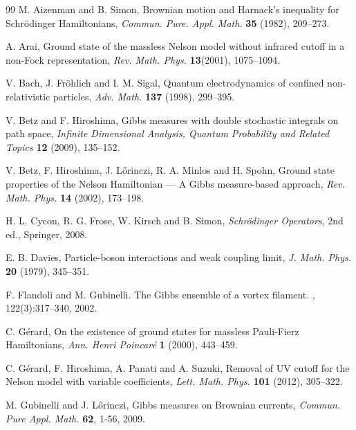 \documentclass[12pt]{article}
\providecommand{\1}{\mathbb{1}}
\begin{document}
{%
\begin{thebibliography}{99}
M.  Aizenman and B. Simon,
Brownian motion and Harnack's inequality for Schr\"odinger Hamiltonians,
{\it Commun. Pure. Appl. Math. }{\bf 35} (1982), 209--273.

A.  Arai,
Ground state of the massless Nelson model without infrared cutoff in a non-Fock representation,
{\it Rev. Math. Phys.} {\bf 13}(2001), 1075--1094.

V.  Bach,   J.  Fr\"ohlich and    I.  M.  Sigal,
Quantum electrodynamics of confined non-relativistic particles, {\it  Adv. Math. } {\bf 137}
(1998),   299--395.

V. Betz and F. Hiroshima,
Gibbs measures with double stochastic integrals on path space,
{\it Infinite Dimensional Analysis,  Quantum Probability and Related Topics}
{\bf 12} (2009),  135--152.


V.  Betz, F.  Hiroshima,  J.  L\H orinczi,
R.  A.  Minlos and H.  Spohn,
Ground state properties of the Nelson Hamiltonian --- A Gibbs measure-based approach,
{\it Rev. Math. Phys.} {\bf 14}  (2002), 173--198.


H. L.  Cycon, R.  G.  Frose, W.  Kirsch
and B.  Simon,
{\it Schr\"odinger Operators}, 2nd ed., Springer, 2008.

E. B.  Davies,   Particle-boson interactions and weak coupling limit,
{\it  J. Math. Phys.} {\bf 20}  (1979),  345--351.


F. Flandoli and M. Gubinelli. 
\newblock The {G}ibbs ensemble of a vortex filament. 
, 122(3):317--340, 2002.

C.  G\'erard,
On the existence of ground states for massless Pauli-Fierz Hamiltonians,
{\it Ann.  Henri  Poincar\'e} {\bf 1}  (2000),  443--459.


C. G\'erard, F. Hiroshima, A. Panati and A. Suzuki,
Removal of UV cutoff for the Nelson model with variable coefficients,
{\it Lett. Math. Phys.} {\bf 101} (2012), 305--322.

M. Gubinelli and J. L\H{o}rinczi, 
Gibbs measures on Brownian currents, \emph{Commun. Pure Appl. Math.} \textbf{62}, 1-56, 2009.



\end{thebibliography}}
\end{document}

